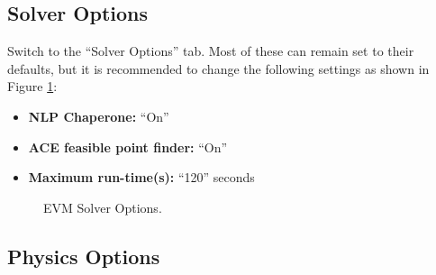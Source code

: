 \documentclass[11pt]{article}
\begin{document}
\subsection{Solver Options}
\label{sec:solver_options}

Switch to the “Solver Options” tab. Most of these can remain set to their defaults, but it is recommended to change the following settings as shown in Figure \ref{fig:solver_options}:

\begin{itemize}
	\item \textbf{\acs{NLP} Chaperone:} ``On''
	\item \textbf{ACE feasible point finder:} ``On''
	\item \textbf{Maximum run-time(s):} ``120'' seconds
\end{itemize}

\begin{figure}[H]
	\centering
	\caption{\label{fig:solver_options}EVM Solver Options.}
\end{figure}

\subsection{Physics Options}
\label{sec:ohysics_options}
\end{document}
